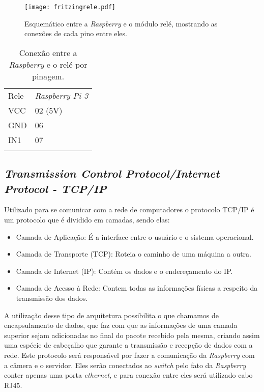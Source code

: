     \begin{figure}[H]
    \centering
    \texttt{[image: fritzingrele.pdf]}
    \caption{Esquemático entre a \emph{Raspberry} e o módulo relé, mostrando as conexões de cada pino entre eles.}
    \label{fritizingrele}
\end{figure}

  \begin{table}[h]
 \centering
 {\renewcommand\arraystretch{1.25}
 \caption{Conexão entre a \emph{Raspberry} e o relé por pinagem.}
 \begin{tabular}{ l l }
  \cline{1-1}\cline{2-2}  
    \multicolumn{1}{|p{3.850cm}|}{Rele \centering } &
    \multicolumn{1}{p{4.217cm}|}{\emph{Raspberry Pi 3} \centering }
  \\  
  \cline{1-1}\cline{2-2}  
    \multicolumn{1}{|p{3.850cm}|}{VCC \centering } &
    \multicolumn{1}{p{4.217cm}|}{02 (5V) \centering }
  \\  
  \cline{1-1}\cline{2-2}  
    \multicolumn{1}{|p{3.850cm}|}{GND \centering } &
    \multicolumn{1}{p{4.217cm}|}{06  \centering }
  \\  
  \cline{1-1}\cline{2-2}  
    \multicolumn{1}{|p{3.850cm}|}{IN1 \centering } &
    \multicolumn{1}{p{4.217cm}|}{07 \centering }
  \\  
   \hline
\label{tabelarele}
 \end{tabular} }
\end{table}  


\subsection{ \emph{Transmission Control Protocol/Internet Protocol - TCP/IP}}
Utilizado para se comunicar com a rede de computadores o protocolo TCP/IP é um protocolo que é dividido em camadas, sendo elas:
\begin{itemize}
    \item Camada de Aplicação: É a interface entre o usuário e o sistema operacional.
    \item Camada de Transporte (TCP): Roteia o caminho de uma máquina a outra.
    \item Camada de Internet (IP): Contém os dados e o endereçamento do IP.
    \item Camada de Acesso à Rede: Contem todas as informações físicas a respeito da transmissão dos dados.
    
\end{itemize}

A utilização desse tipo de arquitetura possibilita o que chamamos de encapsulamento de dados, que faz com que as informações de uma camada superior sejam adicionadas no final do pacote recebido pela mesma, criando assim uma espécie de cabeçalho que garante a transmissão e recepção de dados com a rede.
Este protocolo será responsável por fazer a comunicação da \emph{Raspberry} com a câmera e o servidor. Eles serão conectados ao \emph{switch} pelo fato da \emph{Raspberry} conter apenas uma porta \emph{ethernet}, e para conexão entre eles será utilizado cabo RJ45.

